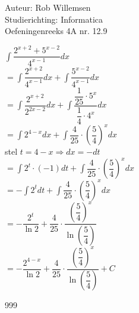 \documentclass[a4paper]{article}
\newcommand{\dint}{\displaystyle\int}
\begin{document}
\noindent \large Auteur: Rob Willemsen \\
\noindent \large Studierichting: Informatica \\
\noindent \large Oefeningenreeks 4A nr. 12.9 \\

\medskip

\normalsize

$\dint \dfrac{2^{x+2} + 5^{x-2}}{4^{x-1}} dx$ \\

$= \dint \dfrac{2^{x+2}}{4^{x-1}} dx + \dint \dfrac{5^{x-2}}{4^{x-1}} dx$ \\

$= \dint \dfrac{2^{x+2}}{2^{2x-2}} dx + \dint \dfrac{\dfrac{1}{25} \cdot 5^x}{\dfrac{1}{4} \cdot 4^x} dx$ \\

$= \dint 2^{4-x} dx + \dint \dfrac{4}{25} \cdot \left(\dfrac{5}{4}\right)^x dx$ \\

stel $t = 4-x \Rightarrow dx = -dt$ \\

$= \dint 2^t \cdot (-1) dt + \dint \dfrac{4}{25} \cdot \left(\dfrac{5}{4}\right)^x dx$ \\

$= -\dint 2^t dt + \dint \dfrac{4}{25} \cdot \left(\dfrac{5}{4}\right)^x dx$ \\

$= -\dfrac{2^t}{\ln 2} + \dfrac{4}{25} \cdot \dfrac{\left(\dfrac{5}{4}\right)^x}{\ln\left(\dfrac{5}{4}\right)}$ \\

$= -\dfrac{2^{4-x}}{\ln 2} + \dfrac{4}{25} \cdot \dfrac{\left(\dfrac{5}{4}\right)^x}{\ln\left(\dfrac{5}{4}\right)} + C$ \\

\begin{thebibliography}{999}
\end{thebibliography}
\end{document}
